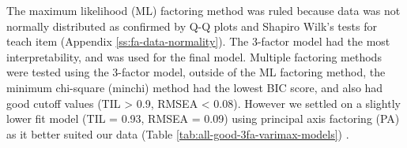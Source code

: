 \documentclass[020-persona\_validation.tex]{subfiles}
\begin{document}
        The maximum likelihood (ML) factoring method was ruled because data was not normally distributed
        as confirmed by Q-Q plots and Shapiro Wilk's tests for teach item (Appendix \ref{ss:fa-data-normality}).
        The 3-factor model had the most interpretability, and was used for the final model.
        Multiple factoring methods were tested using the 3-factor model,
        outside of the ML factoring method, the minimum chi-square (minchi) method had the lowest BIC score,
        and also had good cutoff values (TIL > 0.9, RMSEA < 0.08).
        However we settled on a slightly lower fit model (TIL = 0.93, RMSEA = 0.09) using principal axis factoring (PA)
        as it better suited our data (Table \ref{tab:all-good-3fa-varimax-models})
        \cite{arifinExploratoryFactorAnalysis2017}.
\end{document}
